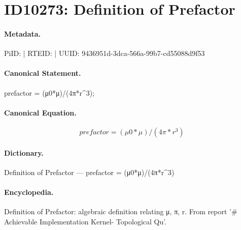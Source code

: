 \section*{ID10273: Definition of Prefactor}
\paragraph{Metadata.}
PiID:  | RTEID:  | UUID: 9436951d-3dca-566a-99b7-cd55088d9f53

\paragraph{Canonical Statement.}
prefactor = (μ0*μ)/(4π*r\textasciicircum{}3);

\paragraph{Canonical Equation.}
\[
prefactor = (μ0*μ)/(4π*r^3)
\]

\paragraph{Dictionary.}
Definition of Prefactor — prefactor = (μ0*μ)/(4π*r\textasciicircum{}3)

\paragraph{Encyclopedia.}
Definition of Prefactor: algebraic definition relating μ, π, r. From report '\# Achievable Implementation Kernel- Topological Qu'.
